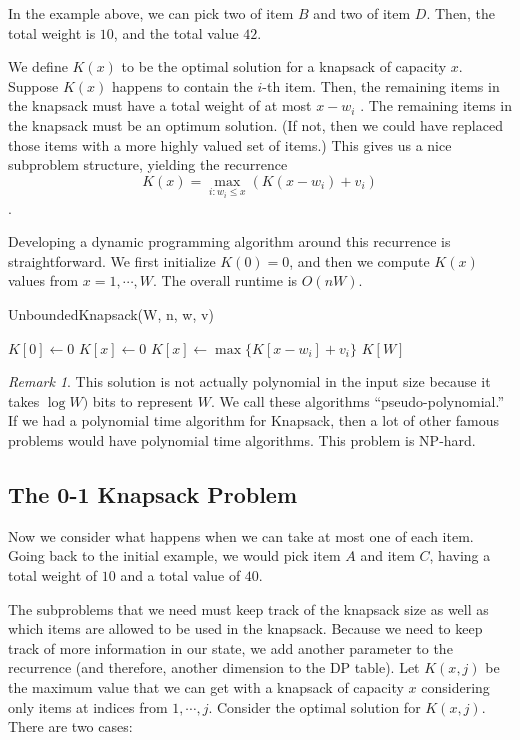 \documentclass [12pt]{article}
\theoremstyle{definition}
\begin{document}
In the example above, we can pick two of item $B$ and two of item $D$. Then, the total weight is $10$, and the total value $42$. 

We define $K(x)$ to be the optimal solution for a knapsack of capacity $x$. Suppose $K(x)$ happens to contain the $i$-th item. Then, the remaining items in the knapsack must have a total weight of at most $x -  w_i$ . The remaining items in the knapsack must be an optimum solution. (If not, then we could have replaced those items with a more highly valued set of items.) This gives us a nice subproblem structure, yielding the recurrence
$$
K(x) = \max_{i:w_i\leq x}(K(x - w_i ) + v_i )
$$.

Developing a dynamic programming algorithm around this recurrence is straightforward. We first initialize $K(0) = 0$, and then we compute $K(x)$ values from $x = 1, \cdots , W$. The overall runtime is $O(nW)$.

\begin{algorithm}
\caption{UnboundedKnapsack(W, n, w, v)}
\label{alg:unboundedknapsack}
\begin{algorithmic}
\STATE $K[0]\gets 0$
  \STATE $K[x] \gets 0$
      \STATE $K[x] \gets \max\{K[x-w_i] + v_i \}$
    \ENDIF
  \ENDFOR
\ENDFOR
\RETURN $K[W]$
\end{algorithmic}
\end{algorithm}

\textit{Remark 1}. This solution is not actually polynomial in the input size because it takes $\log W)$ bits to represent $W$. We call these algorithms ``pseudo-polynomial.'' If we had a polynomial time algorithm for Knapsack, then a lot of other famous problems would have polynomial time algorithms. This problem is NP-hard.

\subsection{The 0-1 Knapsack Problem}
Now we consider what happens when we can take at most one of each item. Going back to the initial example, we would pick item $A$ and item $C$, having a total weight of $10$ and a total value of $40$.

The subproblems that we need must keep track of the knapsack size as well as which items are allowed to be used in the knapsack. Because we need to keep track of more information in our state, we add another parameter to the recurrence (and therefore, another dimension to the DP table). Let $K(x, j)$ be the maximum value that we can get with a knapsack of capacity $x$ considering only items at indices from $1, \cdots , j$. Consider the optimal solution for $K(x, j)$. There are two cases: 
\end{document}

